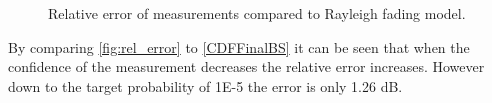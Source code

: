 \begin{figure}[H]
\centering

\caption{Relative error of measurements compared to Rayleigh fading model.}
\label{fig:rel_error}
\end{figure}

By comparing \autoref{fig:rel_error} to \autoref{CDFFinalBS} it can be seen that when the confidence of the measurement decreases the relative error increases. However down to the target probability of 1E-5 the error is only 1.26 dB. 









